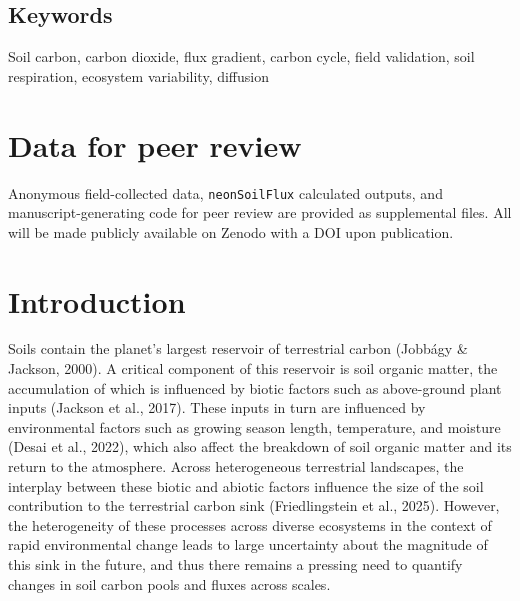 \documentclass[
  letterpaper,
  DIV=11,
  numbers=noendperiod]{scrartcl}
\begin{document}
\subsection{Keywords}\label{keywords}

Soil carbon, carbon dioxide, flux gradient, carbon cycle, field
validation, soil respiration, ecosystem variability, diffusion

\section{Data for peer review}\label{data-for-peer-review}

Anonymous field-collected data, \texttt{neonSoilFlux} calculated
outputs, and manuscript-generating code for peer review are provided as
supplemental files. All will be made publicly available on Zenodo with a
DOI upon publication.

\section{Introduction}\label{introduction}

Soils contain the planet's largest reservoir of terrestrial carbon
(Jobbágy \& Jackson, 2000). A critical component of this reservoir is
soil organic matter, the accumulation of which is influenced by biotic
factors such as above-ground plant inputs (Jackson et al., 2017). These
inputs in turn are influenced by environmental factors such as growing
season length, temperature, and moisture (Desai et al., 2022), which
also affect the breakdown of soil organic matter and its return to the
atmosphere. Across heterogeneous terrestrial landscapes, the interplay
between these biotic and abiotic factors influence the size of the soil
contribution to the terrestrial carbon sink (Friedlingstein et al.,
2025). However, the heterogeneity of these processes across diverse
ecosystems in the context of rapid environmental change leads to large
uncertainty about the magnitude of this sink in the future, and thus
there remains a pressing need to quantify changes in soil carbon pools
and fluxes across scales.
\end{document}
